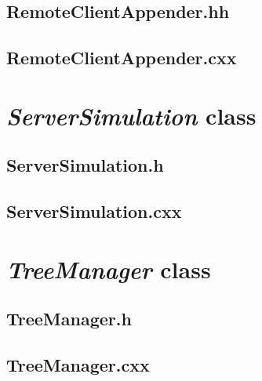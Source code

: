 \subsection{RemoteClientAppender.hh}


\newpage

\subsection{RemoteClientAppender.cxx}


\newpage


\section{\textit{ServerSimulation} class}

\subsection{ServerSimulation.h}


\newpage

\subsection{ServerSimulation.cxx}


\newpage


\section{\textit{TreeManager} class}

\subsection{TreeManager.h}


\newpage

\subsection{TreeManager.cxx}


\newpage
